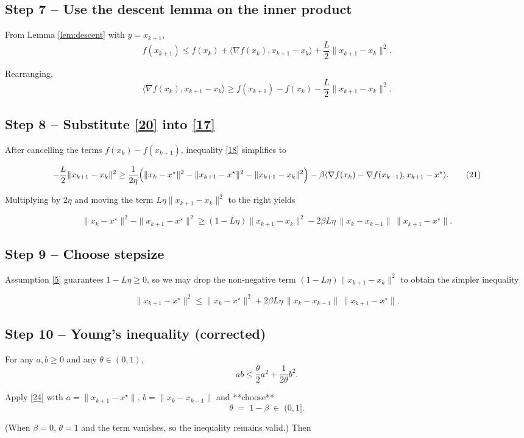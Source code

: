 \documentclass{article}
\begin{document}
\subsection*{Step 7 – Use the descent lemma on the inner product}
From Lemma \ref{lem:descent} with $y=x_{k+1}$,
\[
f(x_{k+1})\le f(x_k)+\langle \nabla f(x_k),x_{k+1}-x_k\rangle+\frac{L}{2}\|x_{k+1}-x_k\|^{2}.
\tag{19}
\]

Rearranging,
\[
\langle \nabla f(x_k),x_{k+1}-x_k\rangle \ge
f(x_{k+1})-f(x_k)-\frac{L}{2}\|x_{k+1}-x_k\|^{2}.
\tag{20}
\]

\subsection*{Step 8 – Substitute \eqref{20} into \eqref{17}}
After cancelling the terms $f(x_k)-f(x_{k+1})$, inequality \eqref{18} simplifies to  

\[
-\frac{L}{2}\|x_{k+1}-x_k\|^{2}
\ge \frac{1}{2\eta}\Bigl(\|x_k-x^\star\|^{2}
-\|x_{k+1}-x^\star\|^{2}
-\|x_{k+1}-x_k\|^{2}\Bigr)
-\beta\langle \nabla f(x_k)-\nabla f(x_{k-1}),x_{k+1}-x^\star\rangle .
\tag{21}
\]

Multiplying by $2\eta$ and moving the term $L\eta\|x_{k+1}-x_k\|^{2}$ to the right yields  

\[
\|x_k-x^\star\|^{2}-\|x_{k+1}-x^\star\|^{2}
\ge (1-L\eta)\|x_{k+1}-x_k\|^{2}
-2\beta L\eta\,\|x_k-x_{k-1}\|\,\|x_{k+1}-x^\star\|.
\tag{22}
\]

\subsection*{Step 9 – Choose stepsize}
Assumption \eqref{5} guarantees $1-L\eta\ge0$, so we may drop the non‑negative term
$(1-L\eta)\|x_{k+1}-x_k\|^{2}$ to obtain the simpler inequality  

\[
\|x_{k+1}-x^\star\|^{2}\le
\|x_k-x^\star\|^{2}
+2\beta L\eta\,\|x_k-x_{k-1}\|\,\|x_{k+1}-x^\star\|.
\tag{23}
\]

\subsection*{Step 10 – Young’s inequality (corrected)}
For any $a,b\ge0$ and any $\theta\in(0,1)$,
\[
ab\le \frac{\theta}{2}a^{2}+\frac{1}{2\theta}b^{2}.
\tag{24}
\]

Apply \eqref{24} with  
$a=\|x_{k+1}-x^\star\|$, $b=\|x_k-x_{k-1}\|$ and **choose**
\[
\theta \;=\; 1-\beta\;\in\;(0,1] .
\tag{25}
\]

(When $\beta=0$, $\theta=1$ and the term vanishes, so the inequality remains valid.)  
Then
\end{document}
